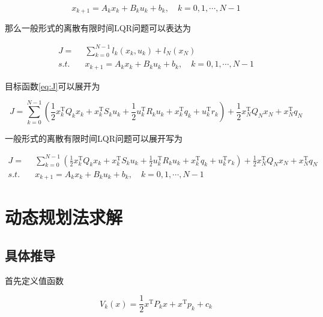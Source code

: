\documentclass[withoutpreface,bwprint]{NoteBook}
\begin{document}
\begin{equation}
\label{eq:state_space_equatoin}
x_{k+1} = A_k x_k + B_k u_k + b_k, \quad k=0,1,\cdots,N-1
\end{equation}

那么一般形式的离散有限时间LQR问题可以表达为

\begin{equation}
\begin{aligned}
\label{eq:general_discrete_finite_time_LQR_problem}
J=&\sum_{k=0}^{N-1}{l_k\left( x_k,u_k \right)}+l_N\left( x_N \right) \\
s.t.\quad& x_{k+1} = A_k x_k + B_k u_k + b_k, \quad k=0,1,\cdots,N-1
\end{aligned}
\end{equation}


目标函数\cref{eq:J}​可以展开为

\begin{equation}
\label{eq:J_detail}
J = \sum_{k=0}^{N-1} \left( \frac{1}{2}x_k^\mathrm{T} Q_k x_k
+ x_k^\mathrm{T} S_k u_k
+ \frac{1}{2}u_k^\mathrm{T} R_k u_k + x_k^\mathrm{T}q_k
+ u_k^\mathrm{T} r_k \right) 
+ \frac{1}{2}x_N^\mathrm{T} Q_N x_N + x_N^\mathrm{T}q_N
\end{equation}

一般形式的离散有限时间LQR问题可以展开写为

\begin{equation}
\label{eq:general_discrete_finite_time_LQR_problem_detail}
\begin{aligned}
J=& \sum_{k=0}^{N-1} \left( \frac{1}{2}x_k^\mathrm{T} Q_k x_k
+ x_k^\mathrm{T} S_k u_k
+ \frac{1}{2}u_k^\mathrm{T} R_k u_k + x_k^\mathrm{T}q_k
+ u_k^\mathrm{T} r_k \right) 
+ \frac{1}{2}x_N^\mathrm{T} Q_N x_N + x_N^\mathrm{T}q_N\\
s.t.\quad & x_{k+1} = A_k x_k + B_k u_k + b_k, \quad k=0,1,\cdots,N-1
\end{aligned}
\end{equation}



\section{动态规划法求解}

\subsection{具体推导}

首先定义值函数

\begin{equation}
\label{eq:Value_func}
V_k\left(x \right) = \frac{1}{2}x^\mathrm{T} P_k x + x^\mathrm{T}p_k + c_k
\end{equation}
\end{document}
